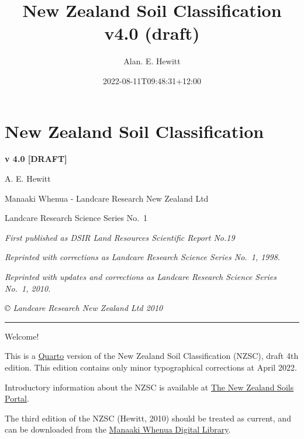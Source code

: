 \documentclass[
  letterpaper,
  DIV=11,
  numbers=noendperiod]{scrreprt}
\title{New Zealand Soil Classification v4.0 (draft)}
\author{Alan. E. Hewitt}
\date{2022-08-11T09:48:31+12:00}
\renewcommand*\contentsname{Table of contents}
\newcommand\contentsname{Table of contents}
\begin{document}
\maketitle
\ifdefined\Shaded\renewenvironment{Shaded}{\begin{tcolorbox}[interior hidden, sharp corners, borderline west={3pt}{0pt}{shadecolor}, breakable, enhanced, frame hidden, boxrule=0pt]}{\end{tcolorbox}}\fi

\renewcommand*\contentsname{Table of contents}
{
\hypersetup{linkcolor=}
\setcounter{tocdepth}{2}
\tableofcontents
}

\hypertarget{new-zealand-soil-classification}{%
\chapter*{New Zealand Soil
Classification}\label{new-zealand-soil-classification}}

\textbf{v 4.0 {[}DRAFT{]}}

A. E. Hewitt

Manaaki Whenua - Landcare Research New Zealand Ltd

Landcare Research Science Series No.~1

\emph{First published as DSIR Land Resources Scientific Report No.19}

\emph{Reprinted with corrections as Landcare Research Science Series
No.~1, 1998.}

\emph{Reprinted with updates and corrections as Landcare Research
Science Series No.~1, 2010.}

\emph{© Landcare Research New Zealand Ltd 2010}

\begin{center}\rule{0.5\linewidth}{0.5pt}\end{center}

Welcome!

This is a \href{https://quarto.org}{Quarto} version of the New Zealand
Soil Classification (NZSC), draft 4th edition. This edition contains
only minor typographical corrections at April 2022.

Introductory information about the NZSC is available at
\href{https://soils.landcareresearch.co.nz/topics/soil-classification/nzsc/}{The
New Zealand Soils Portal}.

The third edition of the NZSC (Hewitt, 2010) should be treated as
current, and can be downloaded from the
\href{http://doi.org/10.7931/DL1-LRSS-1-2010}{Manaaki Whenua Digital
Library}.
\end{document}
